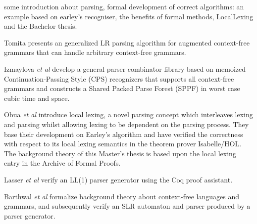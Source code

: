 %
\begin{isabellebody}%
%
%
\isadelimtheory
%
\endisadelimtheory
%
\isatagtheory
%
\endisatagtheory
{\isafoldtheory}%
%
\isadelimtheory
%
\endisadelimtheory
%
\isadelimdocument
%
\endisadelimdocument
%
\isatagdocument
%
\isamarkuptrue%
%
\isamarkuptrue%
%
\endisatagdocument
{\isafolddocument}%
%
\isadelimdocument
%
\endisadelimdocument
%
\begin{isamarkuptext}%
some introduction about parsing, formal development of correct algorithms: an example based on
earley's recogniser, the benefits of formal methods, LocalLexing and the Bachelor thesis.%
\end{isamarkuptext}\isamarkuptrue%
%
\isadelimdocument
%
\endisadelimdocument
%
\isatagdocument
%
\isamarkuptrue%
%
\endisatagdocument
{\isafolddocument}%
%
\isadelimdocument
%
\endisadelimdocument
%
\begin{isamarkuptext}%
Tomita \cite{Tomita:1987} presents an generalized LR parsing algorithm for augmented
context-free grammars that can handle arbitrary context-free grammars.

Izmaylova \textit{et al} \cite{Izmaylova:2016} develop a general parser 
combinator library based on memoized Continuation-Passing Style (CPS) recognizers that supports all
context-free grammars and constructs a Shared Packed Parse Forest (SPPF) in worst case cubic time and space.%
\end{isamarkuptext}\isamarkuptrue%
%
\begin{isamarkuptext}%
Obua \textit{et al} \cite{Obua:2017} introduce local lexing, a novel parsing concept which interleaves
lexing and parsing whilst allowing lexing to be dependent on the parsing process. They base their
development on Earley's algorithm and have verified the correctness with respect to its local lexing
semantics in the theorem prover Isabelle/HOL. The background theory of this Master's thesis is based
upon the local lexing entry \cite{LocalLexing-AFP} in the Archive of Formal Proofs.

Lasser \textit{et al} \cite{Lasser:2019} verify an LL(1) parser generator using the Coq proof assistant.

Barthwal \textit{et al} \cite{Barthwal:2009} formalize background theory
about context-free languages and grammars, and subsequently verify an SLR automaton and parser produced
by a parser generator.


\end{isamarkuptext}
\end{isabellebody}
